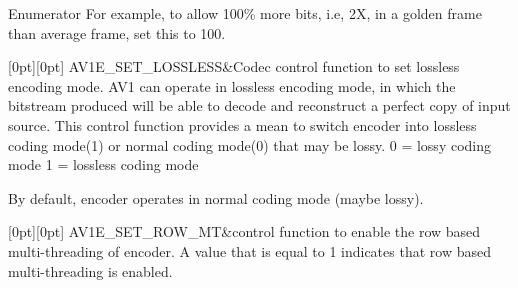 \begin{DoxyEnumFields}{Enumerator}
For example, to allow 100\% more bits, i.\+e, 2X, in a golden frame than average frame, set this to 100. \\
\hline

[0pt][0pt]{}\mbox{\label{group__aom__encoder_ggae78dde67a6d78f332e9bdba0dde42db5afe875c6bb02f236be503c8c7b1f15875}} 
A\+V1\+E\+\_\+\+S\+E\+T\+\_\+\+L\+O\+S\+S\+L\+E\+SS&Codec control function to set lossless encoding mode. A\+V1 can operate in lossless encoding mode, in which the bitstream produced will be able to decode and reconstruct a perfect copy of input source. This control function provides a mean to switch encoder into lossless coding mode(1) or normal coding mode(0) that may be lossy. 0 = lossy coding mode 1 = lossless coding mode

By default, encoder operates in normal coding mode (maybe lossy). \\
\hline

[0pt][0pt]{}\mbox{\label{group__aom__encoder_ggae78dde67a6d78f332e9bdba0dde42db5a095d0817d339940aa2578924a840fc84}} 
A\+V1\+E\+\_\+\+S\+E\+T\+\_\+\+R\+O\+W\+\_\+\+MT&control function to enable the row based multi-\/threading of encoder. A value that is equal to 1 indicates that row based multi-\/threading is enabled. \\
\hline


\end{DoxyEnumFields}
